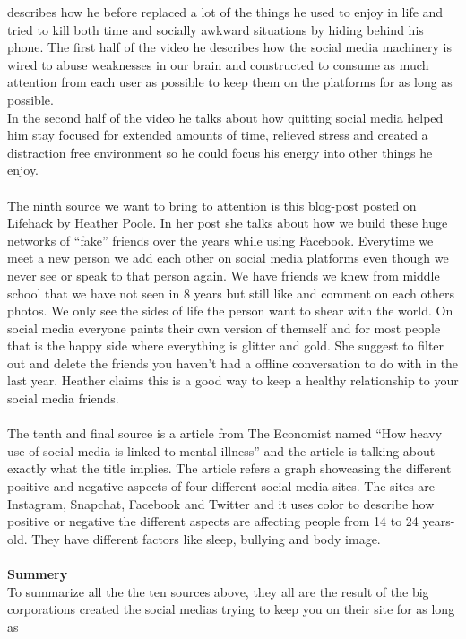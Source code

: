\documentclass[11pt]{article}
\begin{document}
describes how he before replaced a lot of the things he used to enjoy in life and tried
to kill both time and socially awkward situations by hiding behind his phone. The first
half of the video he describes how the social media machinery is wired to abuse
weaknesses in our brain and constructed to consume as much attention from each user as
possible to keep them on the platforms for as long as possible.\\
In the second half of the video he talks about how quitting social media helped him stay
focused for extended amounts of time, relieved stress and created a distraction free
environment so he could focus his energy into other things he enjoy.\\
\\
The ninth source \cite{lifehack} we want to bring to attention is this blog-post posted
on Lifehack by Heather Poole. In her post she talks about how we build these huge
networks of “fake” friends over the years while using Facebook. Everytime we meet a new
person we add each other on social media platforms even though we never see or speak to
that person again. We have friends we knew from middle school that we have not seen in
8 years but still like and comment on each others photos. We only see the sides of life
the person want to shear with the world. On social media everyone paints their own
version of themself and for most people that is the happy side where everything is
glitter and gold. She suggest to filter out and delete the friends you haven’t had a
offline conversation to do with in the last year. Heather claims this is a good way to
keep a healthy relationship to your social media friends.\\
\\
The tenth and final source \cite{economist} is a article from The Economist named “How
heavy use of social media is linked to mental illness” and the article is talking about
exactly what the title implies. The article refers a graph showcasing the different
positive and negative aspects of four different social media sites. The sites are
Instagram, Snapchat, Facebook and Twitter and it uses color to describe how positive
or negative the different aspects are affecting people from 14 to 24 years-old. They
have different factors like sleep, bullying and body image.\\
\\
\textbf{Summery}\\
To summarize all the the ten sources above, they all are the result of the big
corporations created the social medias trying to keep you on their site for as long as
\end{document}
